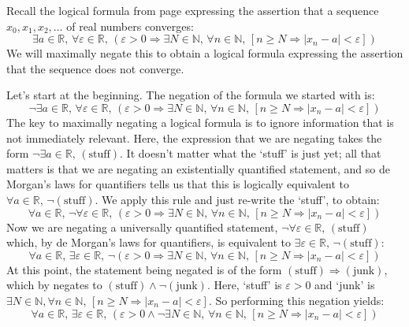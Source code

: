 \begin{example}
Recall the logical formula from page \pageref{pConvergencePreliminary} expressing the assertion that a sequence $x_0, x_1, x_2, \dots$ of real numbers converges:
\[ \exists a \in \mathbb{R},\, \forall \varepsilon \in \mathbb{R},\, (\varepsilon > 0 \Rightarrow \exists N \in \mathbb{N},\, \forall n \in \mathbb{N},\, [n \ge N \Rightarrow |x_n-a| < \varepsilon])\]
We will maximally negate this to obtain a logical formula expressing the assertion that the sequence does not converge.

Let's start at the beginning. The negation of the formula we started with is:
\[ \neg \exists a \in \mathbb{R},\, \forall \varepsilon \in \mathbb{R},\, (\varepsilon > 0 \Rightarrow \exists N \in \mathbb{N},\, \forall n \in \mathbb{N},\, [n \ge N \Rightarrow |x_n-a| < \varepsilon])\]
%
The key to maximally negating a logical formula is to ignore information that is not immediately relevant. Here, the expression that we are negating takes the form $\neg \exists a \in \mathbb{R},\, (\text{stuff})$. It doesn't matter what the `stuff' is just yet; all that matters is that we are negating an existentially quantified statement, and so de Morgan's laws for quantifiers tells us that this is logically equivalent to $\forall a \in \mathbb{R},\, \neg (\text{stuff})$. We apply this rule and just re-write the `stuff', to obtain:
\[ \forall a \in \mathbb{R},\, \neg \forall \varepsilon \in \mathbb{R},\, (\varepsilon > 0 \Rightarrow \exists N \in \mathbb{N},\, \forall n \in \mathbb{N},\, [n \ge N \Rightarrow |x_n-a| < \varepsilon])\]
%
Now we are negating a universally quantified statement, $\neg \forall \varepsilon \in \mathbb{R},\, (\text{stuff})$ which, by de Morgan's laws for quantifiers, is equivalent to $\exists \varepsilon \in \mathbb{R},\, \neg (\text{stuff})$:
\[ \forall a \in \mathbb{R},\, \exists \varepsilon \in \mathbb{R},\, \neg (\varepsilon > 0 \Rightarrow \exists N \in \mathbb{N},\, \forall n \in \mathbb{N},\, [n \ge N \Rightarrow |x_n-a| < \varepsilon])\]
%
At this point, the statement being negated is of the form $(\text{stuff}) \Rightarrow (\text{junk})$, which by  negates to $(\text{stuff}) \wedge \neg (\text{junk})$. Here, `stuff' is $\varepsilon > 0$ and `junk' is $\exists N \in \mathbb{N}, \forall n \in \mathbb{N},\, [n \ge N \Rightarrow |x_n - a| < \varepsilon]$. So performing this negation yields:
\[ \forall a \in \mathbb{R},\, \exists \varepsilon \in \mathbb{R},\, (\varepsilon > 0 \wedge \neg \exists N \in \mathbb{N},\, \forall n \in \mathbb{N},\, [n \ge N \Rightarrow |x_n-a| < \varepsilon])\]

\end{example}
